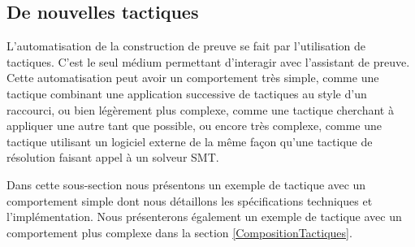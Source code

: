 \documentclass[titlepage,draft]{article}
\begin{document}
\subsection{De nouvelles tactiques}
L'automatisation de la construction de preuve se fait par l'utilisation de tactiques. C'est le seul médium permettant d'interagir avec l'assistant de preuve. Cette automatisation peut avoir un comportement très simple, comme une tactique combinant une application successive de tactiques au style d'un raccourci, ou bien légèrement plus complexe, comme une tactique cherchant à appliquer une autre tant que possible, ou encore très complexe, comme une tactique utilisant un logiciel externe de la même façon qu'une tactique de résolution faisant appel à un solveur SMT.

Dans cette sous-section nous présentons un exemple de tactique avec un comportement simple dont nous détaillons les spécifications techniques et l'implémentation. Nous présenterons également un exemple de tactique avec un comportement plus complexe dans la section \ref{CompositionTactiques}.
\end{document}
